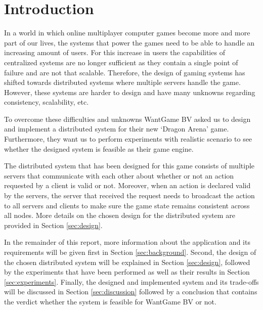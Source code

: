 \section{Introduction}
In a world in which online multiplayer computer games become more and more part of our lives, the systems that power the games need to be able to handle an increasing amount of users.
For this increase in users the capabilities of centralized systems are no longer sufficient as they contain a single point of failure and are not that scalable.
Therefore, the design of gaming systems has shifted towards distributed systems where multiple servers handle the game.
However, these systems are harder to design and have many unknowns regarding consistency, scalability, etc.

To overcome these difficulties and unknowns WantGame BV asked us to design and implement a distributed system for their new `Dragon Arena' game.
Furthermore, they want us to perform experiments with realistic scenario to see whether the designed system is feasible as their game engine.

The distributed system that has been designed for this game consists of multiple servers that communicate with each other about whether or not an action requested by a client is valid or not. 
Moreover, when an action is declared valid by the servers, the server that received the request needs to broadcast the action to all servers and clients to make sure the game state remains consistent across all nodes.
More details on the chosen design for the distributed system are provided in Section \ref{sec:design}.

In the remainder of this report, more information about the application and its requirements will be given first in Section \ref{sec:background}. 
Second, the design of the chosen distributed system will be explained in Section \ref{sec:design}, followed by the experiments that have been performed as well as their results in Section \ref{sec:experiments}.
Finally, the designed and implemented system and its trade-offs will be discussed in Section \ref{sec:discussion} followed by a conclusion that contains the verdict whether the system is feasible for WantGame BV or not.